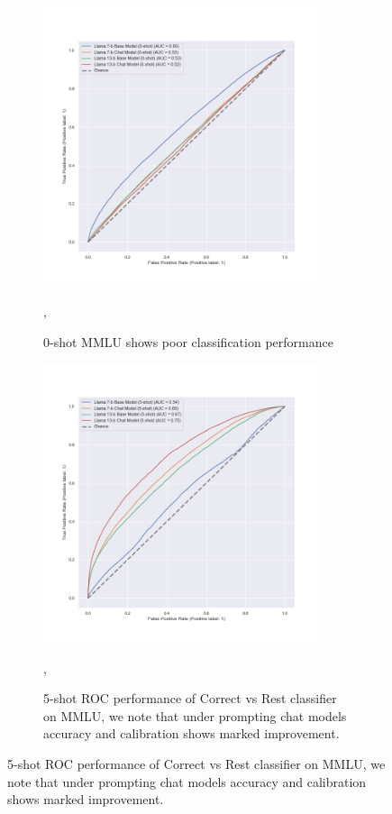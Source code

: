 \documentclass[11pt]{article}
\begin{document}
\begin{figure}
\begin{subfigure}[b]{0.49\textwidth}
         \label{fig:5-shot-logicqa}
     \end{subfigure}     
     \hfill
     \begin{subfigure}[b]{0.49\textwidth}
         \centering \includegraphics[width=0.9\textwidth]{figures/0-shot-MMLU-roc.png}
         \caption{0-shot MMLU shows poor classification performance},
         \label{fig:0-shot-MMLU}
    \end{subfigure} 
     \begin{subfigure}[b]{0.49\textwidth}
         \centering \includegraphics[width=0.9\textwidth]{figures/5-shot-MMLU-roc.png}
         \caption{5-shot ROC performance of Correct vs Rest classifier on 
         MMLU, we note that under prompting chat models accuracy and calibration shows marked improvement.},
         \label{fig:0-shot-MMLU}
    \end{subfigure} 
    

\end{figure}
\end{document}
